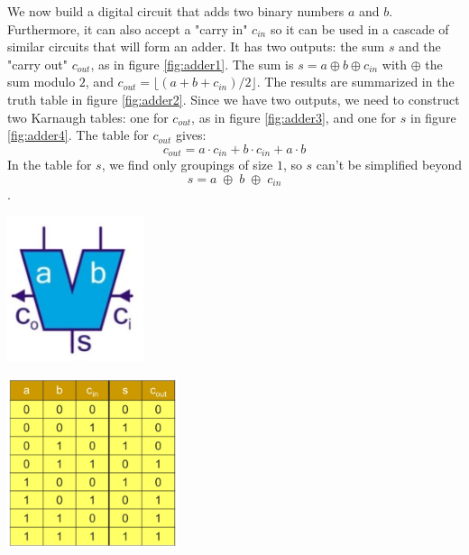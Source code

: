 We now build a  digital circuit that adds two binary numbers $a$ and $b$. Furthermore, it can also accept a "carry in" $c_{in}$ so it can be used in a cascade of similar circuits that will form an adder. It has two outputs: the sum $s$ and the "carry out" $c_{out}$, as in figure \ref{fig:adder1}. The sum is $s = a \oplus b \oplus c_{in}$ with $\oplus$ the sum modulo $2$, and $c_{out} = \lfloor (a + b + c_{in}) / 2 \rfloor$. The results are summarized in the truth table in figure \ref{fig:adder2}. Since we have two outputs, we need to construct two Karnaugh tables: one for $c_{out}$, as in figure \ref{fig:adder3}, and one  for $s$ in figure \ref{fig:adder4}. The table for $c_{out}$ gives:
$$
c_{out} = a \cdot c_{in} + b  \cdot  c_{in} + a  \cdot b
$$
In the table for $s$, we find only groupings of size $1$, so $s$ can't be simplified beyond $$s = a \; \oplus  \;  b  \;  \oplus  \;  c_{in}$$.

\begin{minipage}{.4\textwidth}
	\centering
	\includegraphics[width=4cm]{figures/ch13/adder1.jpg}
	\label{fig:adder1}
\end{minipage}%
\begin{minipage}{.5\textwidth}
	\centering
	\includegraphics[width=5cm]{figures/ch13/adder2.jpg}
	\label{fig:adder2}
\end{minipage}

